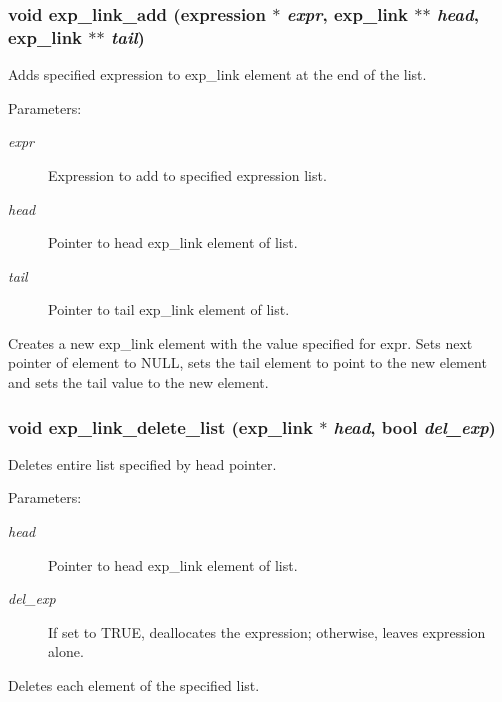\subsubsection{\setlength{\rightskip}{0pt plus 5cm}void exp\_\-link\_\-add ({\bf expression} $\ast$ {\em expr}, {\bf exp\_\-link} $\ast$$\ast$ {\em head}, {\bf exp\_\-link} $\ast$$\ast$ {\em tail})}\label{link_8c_a3}


Adds specified expression to exp\_\-link element at the end of the list.

\begin{Desc}
\item[Parameters:]
\begin{description}
\item[{\em expr}]Expression to add to specified expression list. \item[{\em head}]Pointer to head exp\_\-link element of list. \item[{\em tail}]Pointer to tail exp\_\-link element of list.\end{description}
\end{Desc}
Creates a new exp\_\-link element with the value specified for expr. Sets next pointer of element to NULL, sets the tail element to point to the new element and sets the tail value to the new element. 
\subsubsection{\setlength{\rightskip}{0pt plus 5cm}void exp\_\-link\_\-delete\_\-list ({\bf exp\_\-link} $\ast$ {\em head}, {\bf bool} {\em del\_\-exp})}\label{link_8c_a20}


Deletes entire list specified by head pointer.

\begin{Desc}
\item[Parameters:]
\begin{description}
\item[{\em head}]Pointer to head exp\_\-link element of list. \item[{\em del\_\-exp}]If set to TRUE, deallocates the expression; otherwise, leaves expression alone.\end{description}
\end{Desc}
Deletes each element of the specified list. 
